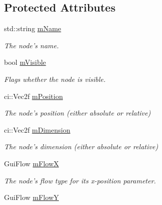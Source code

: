 \subsection*{Protected Attributes}
\begin{DoxyCompactItemize}
\item 
\hypertarget{class_gui_base_ab0e76796e0274a3b538e44cda82a6f5f}{std\-::string \hyperlink{class_gui_base_ab0e76796e0274a3b538e44cda82a6f5f}{m\-Name}}\label{class_gui_base_ab0e76796e0274a3b538e44cda82a6f5f}

\begin{DoxyCompactList}\small\item\em The node's name. \end{DoxyCompactList}\item 
\hypertarget{class_gui_base_a07fc7363624a8d4c586775e7d68114cd}{bool \hyperlink{class_gui_base_a07fc7363624a8d4c586775e7d68114cd}{m\-Visible}}\label{class_gui_base_a07fc7363624a8d4c586775e7d68114cd}

\begin{DoxyCompactList}\small\item\em Flags whether the node is visible. \end{DoxyCompactList}\item 
\hypertarget{class_gui_base_a22d9fe30a7103f02e24396f8473e7317}{ci\-::\-Vec2f \hyperlink{class_gui_base_a22d9fe30a7103f02e24396f8473e7317}{m\-Position}}\label{class_gui_base_a22d9fe30a7103f02e24396f8473e7317}

\begin{DoxyCompactList}\small\item\em The node's position (either absolute or relative) \end{DoxyCompactList}\item 
\hypertarget{class_gui_base_a3f63f449843068c1472454de3fdf1462}{ci\-::\-Vec2f \hyperlink{class_gui_base_a3f63f449843068c1472454de3fdf1462}{m\-Dimension}}\label{class_gui_base_a3f63f449843068c1472454de3fdf1462}

\begin{DoxyCompactList}\small\item\em The node's dimension (either absolute or relative) \end{DoxyCompactList}\item 
\hypertarget{class_gui_base_af3c85abbf0a6aa3e27b679686837dc40}{Gui\-Flow \hyperlink{class_gui_base_af3c85abbf0a6aa3e27b679686837dc40}{m\-Flow\-X}}\label{class_gui_base_af3c85abbf0a6aa3e27b679686837dc40}

\begin{DoxyCompactList}\small\item\em The node's flow type for its x-\/position parameter. \end{DoxyCompactList}\item 
\hypertarget{class_gui_base_a22b6d4da341853066112fd67983a7f29}{Gui\-Flow \hyperlink{class_gui_base_a22b6d4da341853066112fd67983a7f29}{m\-Flow\-Y}}\label{class_gui_base_a22b6d4da341853066112fd67983a7f29}


\end{DoxyCompactItemize}
